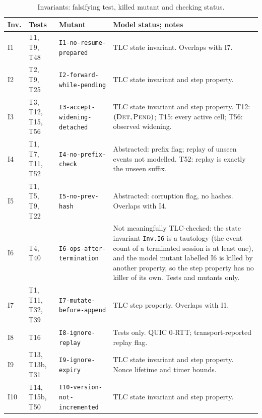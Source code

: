 \begin{table}[htbp]
\centering
\caption{Invariants: falsifying test, killed mutant and checking status.}
\label{tab:invariant-independence}
\scriptsize
\begin{tabularx}{\columnwidth}{l l X X}
\toprule
\textbf{Inv.} & \textbf{Tests} & \textbf{Mutant} & \textbf{Model status; notes} \\
\midrule
I1 & T1, T9, T48 & \texttt{I1-no-resume-prepared} & TLC state invariant. Overlaps with I7. \\
I2 & T2, T9, T25 & \texttt{I2-forward-while-pending} & TLC state invariant and step property. \\
I3 & T3, T12, T15, T56 & \texttt{I3-accept-widening-detached} & TLC state invariant and step property. T12: $(\textsc{Det},\textsc{Pend})$; T15: every active cell; T56: observed widening. \\
I4 & T1, T7, T11, T52 & \texttt{I4-no-prefix-check} & Abstracted: prefix flag; replay of unseen events not modelled. T52: replay is exactly the unseen suffix. \\
I5 & T1, T5, T9, T22 & \texttt{I5-no-prev-hash} & Abstracted: corruption flag, no hashes. Overlaps with I4. \\
I6 & T4, T40 & \texttt{I6-ops-after-termination} & Not meaningfully TLC-checked: the state invariant \texttt{Inv.I6} is a tautology (the event count of a terminated session is at least one), and the model mutant labelled I6 is killed by another property, so the step property has no killer of its own. Tests and mutants only. \\
I7 & T1, T11, T32, T39 & \texttt{I7-mutate-before-append} & TLC step property. Overlaps with I1. \\
I8 & T16 & \texttt{I8-ignore-replay} & Tests only. QUIC 0-RTT; transport-reported replay flag. \\
I9 & T13, T13b, T31 & \texttt{I9-ignore-expiry} & TLC state invariant and step property. Nonce lifetime and timer bounds. \\
I10 & T14, T15b, T50 & \texttt{I10-version-not-incremented} & TLC state invariant and step property. \\

\end{tabularx}
\end{table}
